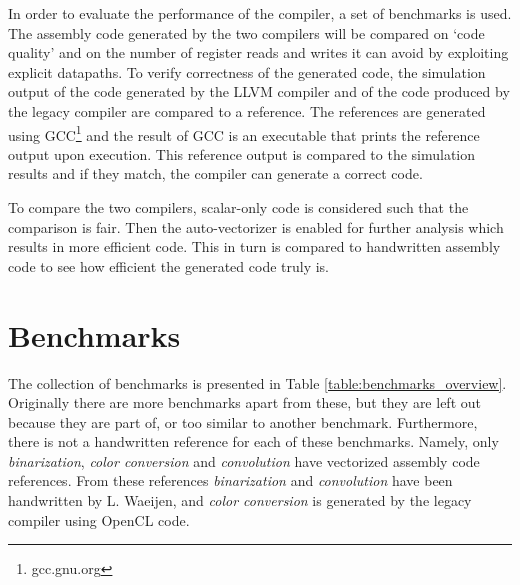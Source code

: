 
In order to evaluate the performance of the compiler, a set of benchmarks is used. The assembly code generated by the two compilers will be compared on `code quality' and on the number of register reads and writes it can avoid by exploiting explicit datapaths. To verify correctness of the generated code, the simulation output of the code generated by the LLVM compiler and of the code produced by the legacy compiler are compared to a reference. The references are generated using GCC\footnote{gcc.gnu.org} and the result of GCC is an executable that prints the reference output upon execution. This reference output is compared to the simulation results and if they match, the compiler can generate a correct code.

To compare the two compilers, scalar-only code is considered such that the comparison is fair. Then the auto-vectorizer is enabled for further analysis which results in more efficient code. This in turn is compared to handwritten assembly code to see how efficient the generated code truly is.

\section{Benchmarks}
The collection of benchmarks is presented in Table \ref{table:benchmarks_overview}. Originally there are more benchmarks apart from these, but they are left out because they are part of, or too similar to another benchmark. Furthermore, there is not a handwritten reference for each of these benchmarks. Namely, only \emph{binarization}, \emph{color conversion} and \emph{convolution} have vectorized assembly code references. From these references \emph{binarization} and \emph{convolution} have been handwritten by L. Waeijen, and \emph{color conversion} is generated by the legacy compiler using OpenCL code.

